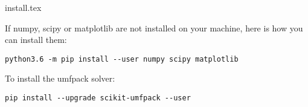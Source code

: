 \begin{flushright} {\tiny {\color{gray} install.tex}} \end{flushright}

If numpy, scipy or matplotlib are not installed on your machine, here is how you 
can install them:
\begin{verbatim}
python3.6 -m pip install --user numpy scipy matplotlib
\end{verbatim}
To install the umfpack solver:
\begin{verbatim}
pip install --upgrade scikit-umfpack --user
\end{verbatim}

